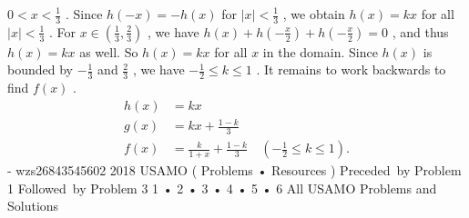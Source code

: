 \documentclass[12pt]{article}
\begin{document}
$0<x<\frac13$ . Since $h(-x)=-h(x)$ for $|x|<\frac13$ , we obtain $h(x)=kx$ for all $|x|<\frac13$ . For $x\in\left(\frac13,\frac23\right)$ , we have $h(x)+h\left(-\frac x2\right)+h\left(-\frac x2\right)=0$ , and thus $h(x)=kx$ as well. So $h(x)=kx$ for all $x$ in the domain. Since $h(x)$ is bounded by $-\frac13$ and $\frac23$ , we have $-\frac12\le k\le1$ . It remains to work backwards to find $f(x)$ . \begin{align*} h(x) &= kx \\ g(x) &= kx+\frac{1-k}3 \\ f(x) &= \frac k{1+x}+\frac{1-k}3\quad\left(-\frac12\le k\le1\right). \end{align*} - wzs26843545602 2018 USAMO ( Problems • Resources ) Preceded by Problem 1 Followed by Problem 3 1 • 2 • 3 • 4 • 5 • 6 All USAMO Problems and Solutions
\end{document}
